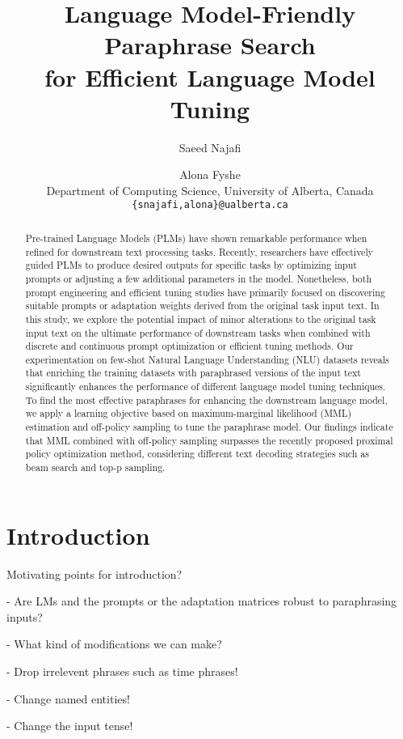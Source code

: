 \documentclass[11pt]{article}
\title{Language Model-Friendly Paraphrase Search \\
for Efficient Language Model Tuning}
\author{Saeed Najafi \and
  Alona Fyshe \\
  Department of Computing Science, University of Alberta, Canada\\
  \texttt{\{snajafi,alona\}@ualberta.ca} \\}
\begin{document}
\maketitle
\begin{abstract}
Pre-trained Language Models (PLMs) have shown remarkable performance when refined for downstream text processing tasks. Recently, researchers have effectively guided PLMs to produce desired outputs for specific tasks by optimizing input prompts or adjusting a few additional parameters in the model. Nonetheless, both prompt engineering and efficient tuning studies have primarily focused on discovering suitable prompts or adaptation weights derived from the original task input text. In this study, we explore the potential impact of minor alterations to the original task input text on the ultimate performance of downstream tasks when combined with discrete and continuous prompt optimization or efficient tuning methods. Our experimentation on few-shot Natural Language Understanding (NLU) datasets reveals that enriching the training datasets with paraphrased versions of the input text significantly enhances the performance of different language model tuning techniques. To find the most effective paraphrases for enhancing the downstream language model, we apply a learning objective based on maximum-marginal likelihood (MML) estimation and off-policy sampling to tune the paraphrase model. Our findings indicate that MML combined with off-policy sampling surpasses the recently proposed proximal policy optimization method, considering different text decoding strategies such as beam search and top-p sampling.
\end{abstract}


\section{Introduction}
Motivating points for introduction?

- Are LMs and the prompts or the adaptation matrices robust to paraphrasing inputs?

- What kind of modifications we can make?

- Drop irrelevent phrases such as time phrases!

- Change named entities!

- Change the input tense!
\end{document}

